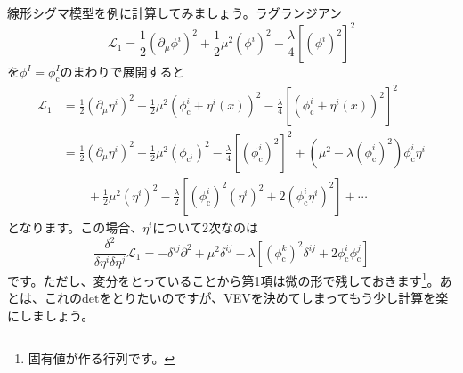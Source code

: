 \documentclass[unicode,a4paper,11pt]{ltjsarticle}
\theoremstyle{definition}
\begin{document}
線形シグマ模型を例に計算してみましょう。ラグランジアン
\begin{equation}
   \mathcal{L}_{1}
   =
   \frac{1}{2}(\partial_{\mu}\phi^{i})^2
   +
   \frac{1}{2}\mu^2 (\phi^{i})^2
   -
   \frac{\lambda}{4}[(\phi^{i})^2]^2
\end{equation}
を$\phi^{I}=\phi_{\mathrm{c}}^{I}$のまわりで展開すると
\begin{align}
   \mathcal{L}_{1}
    & =
   \frac{1}{2}(\partial_{\mu}\eta^{i})^2
   +
   \frac{1}{2}\mu^2 (\phi_{\mathrm{c}}^{i}+\eta^{i}(x))^2
   -
   \frac{\lambda}{4}[(\phi_{\mathrm{c}}^{i}+\eta^{i}(x))^2]^2
   \nonumber
   \\
    & =
   \frac{1}{2}(\partial_{\mu}\eta^{i})^2
   +
   \frac{1}{2}\mu^2(\phi_{\mathrm{c}^{i}})^2
   -
   \frac{\lambda}{4}[(\phi_{\mathrm{c}}^{i})^2]^2
   +
   (\mu^2-\lambda(\phi_{\mathrm{c}}^{i})^2)\phi_{\mathrm{c}}^{i}\eta^{i}
   \nonumber
   \\
    & \qquad
   +
   \frac{1}{2}\mu^2(\eta^{i})^2
   -
   \frac{\lambda}{2}[(\phi_{\mathrm{c}}^{i})^2(\eta^{i})^2+2(\phi_{\mathrm{c}}^{i}\eta^{i})^2]
   +
   \cdots
\end{align}
となります。この場合、$\eta^{i}$について2次なのは
\begin{equation}
   \frac{\delta^{2}}{\delta\eta^{i}\delta\eta^{j}}\mathcal{L}_{1}
   =
   -
   \delta^{ij}\partial^{2}
   +
   \mu^2\delta^{ij}
   -
   \lambda[(\phi_{\mathrm{c}}^{k})^2\delta^{ij}+2\phi_{\mathrm{c}}^{i}\phi_{\mathrm{c}}^{j}]
\end{equation}
です。ただし、変分をとっていることから第1項は微の形で残しておきます\footnote{
   固有値が作る行列です。
}。あとは、これの$\mathrm{det}$をとりたいのですが、VEVを決めてしまってもう少し計算を楽にしましょう。
\end{document}
